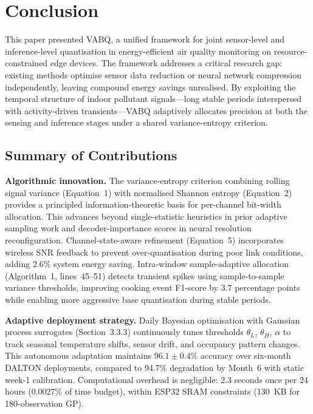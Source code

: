 \section{Conclusion}
\label{sec:conclusion}

This paper presented VABQ, a unified framework for joint sensor-level and inference-level quantisation in energy-efficient air quality monitoring on resource-constrained edge devices. The framework addresses a critical research gap: existing methods optimise sensor data reduction or neural network compression independently, leaving compound energy savings unrealised. By exploiting the temporal structure of indoor pollutant signals---long stable periods interspersed with activity-driven transients---VABQ adaptively allocates precision at both the sensing and inference stages under a shared variance-entropy criterion.

\subsection{Summary of Contributions}

\textbf{Algorithmic innovation.} The variance-entropy criterion combining rolling signal variance (Equation~1) with normalised Shannon entropy (Equation~2) provides a principled information-theoretic basis for per-channel bit-width allocation. This advances beyond single-statistic heuristics in prior adaptive sampling work and decoder-importance scores in neural resolution reconfiguration. Channel-state-aware refinement (Equation~5) incorporates wireless SNR feedback to prevent over-quantisation during poor link conditions, adding 2.6\% system energy saving. Intra-window sample-adaptive allocation (Algorithm~1, lines~45--51) detects transient spikes using sample-to-sample variance thresholds, improving cooking event F1-score by 3.7 percentage points while enabling more aggressive base quantisation during stable periods.

\textbf{Adaptive deployment strategy.} Daily Bayesian optimisation with Gaussian process surrogates (Section~3.3.3) continuously tunes thresholds $\theta_L$, $\theta_H$, $\alpha$ to track seasonal temperature shifts, sensor drift, and occupancy pattern changes. This autonomous adaptation maintains $96.1 \pm 0.4$\% accuracy over six-month DALTON deployments, compared to 94.7\% degradation by Month~6 with static week-1 calibration. Computational overhead is negligible: 2.3 seconds once per 24 hours (0.0027\% of time budget), within ESP32 SRAM constraints (130~KB for 180-observation GP).

